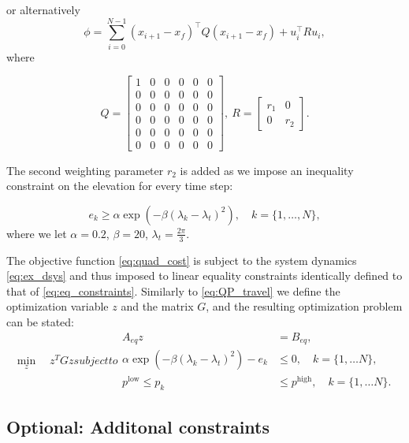 or alternatively
\begin{equation}
	\label{eq:quad_cost}
	\phi = \sum_{i=0}^{N-1} (x_{i+1}-x_f)^\top Q(x_{i+1}-x_f) + u_i^\top R u_i,
\end{equation}
where

\begin{equation}
Q = \begin{bmatrix}1&0&0&0&0&0\\0&0&0&0&0&0\\0&0&0&0&0&0\\0&0&0&0&0&0\\0&0&0&0&0&0\\0&0&0&0&0&0\end{bmatrix}, \ R = \begin{bmatrix}r_1&0\\0&r_2\end{bmatrix}.
\end{equation}

 The second weighting parameter $r_2$ is added as we impose an inequality constraint on the elevation for every time step:

\begin{equation}
	\label{eq:cons}
	e_k \ge \alpha \exp{\left(-\beta\left(\lambda_k - \lambda_t\right)^2\right)}, \quad k = \{1, \dots , N\},
\end{equation}
where we let $\alpha = 0.2$, $\beta = 20$, $\lambda_t = \frac{2\pi}{3}$.

The objective function \eqref{eq:quad_cost} is subject to the system dynamics \eqref{eq:ex_dsys} and thus imposed to linear equality constraints identically defined to that of \eqref{eq:eq_constraints}. Similarly to \eqref{eq:QP_travel} we define the optimization variable $z$ and the matrix $G$, and the resulting optimization problem can be stated:
\begin{subequations}
\label{eq:NOP}
	\begin{equation}
		\min_z \quad z^T G z
	\end{equation}
subject to
\begin{align}
	A_{eq} z &= B_{eq}, \\
	\alpha \exp{\left(-\beta\left(\lambda_k - \lambda_t\right)^2\right)} - e_k &\le 0, \quad k = \{1, \dots N\},\\
	p^{\textrm{low}} \le p_k &\le p^{\textrm{high}}, \quad k = \{1, \dots N\}.
\end{align}
\end{subequations}


\subsection{Optional: Additonal constraints}


